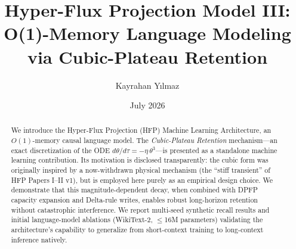 \documentclass[11pt,a4paper]{article}
\title{Hyper-Flux Projection Model III: \\ O(1)-Memory Language Modeling via Cubic-Plateau Retention}
\author{Kayrahan Y{\i}lmaz}
\date{July 2026}
\begin{document}
\maketitle

%
%
%
%
%

\begin{abstract}
\noindent
We introduce the Hyper-Flux Projection (HFP) Machine Learning Architecture, an $O(1)$-memory causal language model. The \emph{Cubic-Plateau Retention} mechanism---an exact discretization of the ODE $d\theta/d\tau = -\eta\,\theta^{3}$---is presented as a standalone machine learning contribution. Its motivation is disclosed transparently: the cubic form was originally inspired by a now-withdrawn physical mechanism (the ``stiff transient'' of HFP Papers I--II v1), but is employed here purely as an empirical design choice. We demonstrate that this magnitude-dependent decay, when combined with DPFP capacity expansion and Delta-rule writes, enables robust long-horizon retention without catastrophic interference. We report multi-seed synthetic recall results and initial language-model ablations (WikiText-2, $\le$16M parameters) validating the architecture's capability to generalize from short-context training to long-context inference natively.
\end{abstract}
\end{document}
